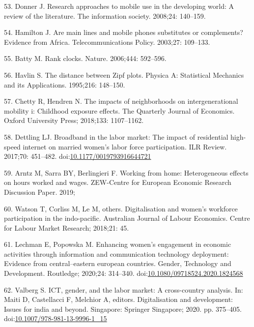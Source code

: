 \documentclass[10pt,letterpaper]{article}
\begin{document}
\leavevmode\hypertarget{ref-donner_research_2008}{}%
53. Donner J. Research approaches to mobile use in the developing world:
A review of the literature. The information society. 2008;24: 140--159.

\leavevmode\hypertarget{ref-hamilton_are_2003}{}%
54. Hamilton J. Are main lines and mobile phones substitutes or
complements? Evidence from Africa. Telecommunications Policy. 2003;27:
109--133.

\leavevmode\hypertarget{ref-batty_rank_2006}{}%
55. Batty M. Rank clocks. Nature. 2006;444: 592--596.

\leavevmode\hypertarget{ref-havlin_distance_1995}{}%
56. Havlin S. The distance between Zipf plots. Physica A: Statistical
Mechanics and its Applications. 1995;216: 148--150.

\leavevmode\hypertarget{ref-chetty2018impacts}{}%
57. Chetty R, Hendren N. The impacts of neighborhoods on
intergenerational mobility i: Childhood exposure effects. The Quarterly
Journal of Economics. Oxford University Press; 2018;133: 1107--1162.

\leavevmode\hypertarget{ref-dettling2017}{}%
58. Dettling LJ. Broadband in the labor market: The impact of
residential high-speed internet on married women's labor force
participation. ILR Review. 2017;70: 451--482.
doi:\href{https://doi.org/10.1177/0019793916644721}{10.1177/0019793916644721}

\leavevmode\hypertarget{ref-arntz2019working}{}%
59. Arntz M, Sarra BY, Berlingieri F. Working from home: Heterogeneous
effects on hours worked and wages. ZEW-Centre for European Economic
Research Discussion Paper. 2019;

\leavevmode\hypertarget{ref-watson2018digitalisation}{}%
60. Watson T, Corliss M, Le M, others. Digitalisation and women's
workforce participation in the indo-pacific. Australian Journal of
Labour Economics. Centre for Labour Market Research; 2018;21: 45.

\leavevmode\hypertarget{ref-Lechman2020}{}%
61. Lechman E, Popowska M. Enhancing women's engagement in economic
activities through information and communication technology deployment:
Evidence from central--eastern european countries. Gender, Technology
and Development. Routledge; 2020;24: 314--340.
doi:\href{https://doi.org/10.1080/09718524.2020.1824568}{10.1080/09718524.2020.1824568}

\leavevmode\hypertarget{ref-Valberg2020}{}%
62. Valberg S. ICT, gender, and the labor market: A cross-country
analysis. In: Maiti D, Castellacci F, Melchior A, editors.
Digitalisation and development: Issues for india and beyond. Singapore:
Springer Singapore; 2020. pp. 375--405.
doi:\href{https://doi.org/10.1007/978-981-13-9996-1_15}{10.1007/978-981-13-9996-1\_15}
\end{document}
